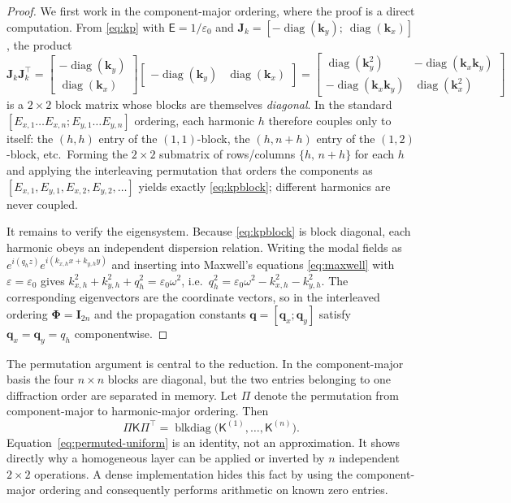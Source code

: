 \documentclass[11pt]{article}
\theoremstyle{remark}
\newcommand{\eps}{\varepsilon}
\newcommand{\kp}{\mathsf{K}}
\newcommand{\epinv}{\mathsf{E}}
\newcommand{\Jk}{\mathbf{J}_k}
\newcommand{\kk}{\mathbf{k}}
\newcommand{\Ph}{\mathbf{\Phi}}
\newcommand{\fq}{\mathbf{q}}
\newcommand{\Id}{\mathbf{I}}
\DeclareMathOperator{\diag}{diag}
\DeclareMathOperator{\blkdiag}{blkdiag}
\begin{document}
\begin{proof}
We first work in the component-major ordering, where the proof is a direct
computation. From \eqref{eq:kp} with
$\epinv=1/\eps_0$ and $\Jk=[-\diag(\kk_y);\ \diag(\kk_x)]$, the product
\begin{equation}
\Jk\Jk^{\top}
=\begin{bmatrix}-\diag(\kk_y)\\ \diag(\kk_x)\end{bmatrix}
\begin{bmatrix}-\diag(\kk_y) & \diag(\kk_x)\end{bmatrix}
=\begin{bmatrix}\diag(\kk_y^2) & -\diag(\kk_x\kk_y)\\
-\diag(\kk_x\kk_y) & \diag(\kk_x^2)\end{bmatrix}
\label{eq:JkJk}
\end{equation}
is a $2\times2$ block matrix whose blocks are themselves \emph{diagonal}. In the
standard $[E_{x,1}\dots E_{x,n};E_{y,1}\dots E_{y,n}]$ ordering, each harmonic
$h$ therefore couples only to itself: the $(h,h)$ entry of the
$(1,1)$-block, the $(h,n+h)$ entry of the $(1,2)$-block, etc.\ Forming the
$2\times2$ submatrix of rows/columns $\{h,\,n+h\}$ for each $h$ and applying
the interleaving permutation that orders the components as
$[E_{x,1},E_{y,1},E_{x,2},E_{y,2},\dots]$ yields exactly
\eqref{eq:kpblock}; different harmonics are never coupled.

It remains to verify the eigensystem. Because \eqref{eq:kpblock} is block
diagonal, each harmonic obeys an independent dispersion relation. Writing the
modal fields as $e^{i(q_h z)}e^{i(k_{x,h}x+k_{y,h}y)}$ and inserting into
Maxwell's equations \eqref{eq:maxwell} with $\eps=\eps_0$ gives
$k_{x,h}^2+k_{y,h}^2+q_h^2=\eps_0\omega^2$, i.e.\ $q_h^2=\eps_0\omega^2-
k_{x,h}^2-k_{y,h}^2$. The corresponding eigenvectors are the coordinate
vectors, so in the interleaved ordering $\Ph=\Id_{2n}$ and the propagation
constants $\fq=[\fq_x;\fq_y]$ satisfy $\fq_x=\fq_y=q_h$ componentwise.
\end{proof}

The permutation argument is central to the reduction.  In the component-major
basis the four $n\times n$ blocks are diagonal, but the two entries belonging
to one diffraction order are separated in memory.  Let $\Pi$ denote the
permutation from component-major to harmonic-major ordering.  Then
\begin{equation}
\Pi\kp\Pi^{\top}
=\blkdiag\bigl(\kp^{(1)},\ldots,\kp^{(n)}\bigr).
\label{eq:permuted-uniform}
\end{equation}
Equation~\eqref{eq:permuted-uniform} is an identity, not an approximation.  It
shows directly why a homogeneous layer can be applied or inverted by $n$
independent $2\times2$ operations.  A dense implementation hides this fact by
using the component-major ordering and consequently performs arithmetic on
known zero entries.
\end{document}
